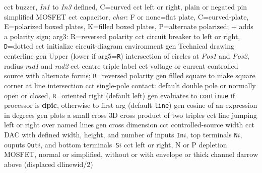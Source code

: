   {cct}
  {buzzer, {\sl In1} to {\sl In3} defined, C=curved}
  {cct}
  {left or right, plain or negated pin simplified MOSFET}
  {cct}
  {capacitor, {\sl char}: F or none=flat plate, C=curved-plate,
    E=polarized boxed plates,
    K=filled boxed plates, P=alternate polarized; + adds a polarity sign;
    arg3:  R=reversed polarity}
  {cct}
  {circuit breaker to left or right, {\tt D}=dotted}
  {cct}
  {initialize circuit-diagram environment}
  {gen}
  {Technical drawing centerline}
  {gen}
  {Upper (lower if arg5={\tt R}) intersection of circles at
    {\sl Pos1} and {\sl Pos2}, radius {\sl rad1} and {\sl rad2}}
  {cct}
  {centre triple label}
  {cct}
  {voltage or current controlled source with alternate forms;
   {\tt R}=reversed polarity}
  {gen}
  {filled square to make square corner at line intersection}
  {cct}
  {single-pole contact: default double pole or
    normally open or closed, {\tt R}=oriented right (default left)}
  {gen}
  {evaluates to {\tt continue}
    if processor is {\bf dpic}, otherwise to first arg (default {\tt line})}
  {gen}
  {cosine of an expression in degrees}
  {gen}
  {plots a small cross}
  {3D}
  {cross product of two triples}
  {cct}
  {line jumping left or right over named lines}
  {gen}
  {cross dimension}
  {cct}
  {controlled-source width}
  {cct}
  {DAC with defined width, height, and number of inputs {\tt In$i$},
    top terminals {\tt N$i$}, ouputs {\tt Out$i$},
    and bottom terminals~{\tt S$i$}}
  {cct}
  {left or right, N or P depletion MOSFET, normal or simplified,
    without or with envelope or thick channel}
  {darrow}
  {above (displaced dlinewid/2)}
